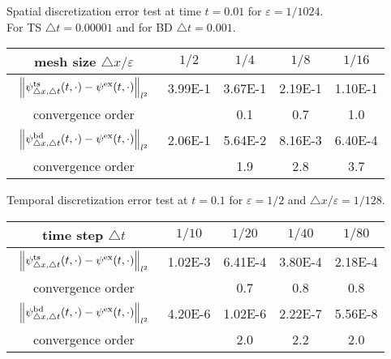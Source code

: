\documentclass[leqno,final]{siamltex}
\numberwithin{equation}{section}
\newcounter{me}
\begin{document}
\begin{table}[htbp]
\begin{center}
{Spatial discretization error test at time $t=0.01$ for ${{\varepsilon }}=1/1024$.\\
For TS ${\triangle} t=0.00001$ and for BD  ${\triangle} t=0.001$. }
\begin{tabular}{c|cccc}\hline
mesh size ${\triangle} x/{{\varepsilon }}$& $1/2$ & $1/4$ & $1/8$ &   $1/16$ \\ \hline
$\begin{array}{c}\vspace*{-4mm} \\
\left\|\psi^{\rm ts}_{{\triangle} x,{\triangle} t}(t,\cdot)-\psi^{\rm
ex}(t,\cdot)\right\|_{l^2}\\ \vspace*{-4mm} \end{array}$
 &  3.99E-1 & 3.67E-1 &  2.19E-1 & 1.10E-1 \\ \hline
convergence order & & 0.1 & 0.7& 1.0 \\ \hline \hline
$\begin{array}{c}\vspace*{-4mm} \\
\left\|\psi^{\rm bd}_{{\triangle} x,{\triangle} t}(t,\cdot)-\psi^{\rm
ex}(t,\cdot)\right\|_{l^2}\\ \vspace*{-4mm} \end{array}$
 &  2.06E-1& 5.64E-2 &  8.16E-3 &  6.40E-4 \\ \hline
convergence order & & 1.9& 2.8& 3.7  \\ \hline 
\end{tabular}\vspace{5mm}

{Temporal discretization error test at $t=0.1$ for ${{\varepsilon }}=1/2$ and
${\triangle} x/{{\varepsilon }}=1/128$.}
\begin{tabular}{c|cccc}\hline
time step ${\triangle} t$& $1/10$ & $1/20$ & $1/40$ &   $1/80$ \\ \hline
$\begin{array}{c}\vspace*{-4mm} \\
\left\|\psi^{\rm ts}_{{\triangle} x,{\triangle} t}(t,\cdot)-\psi^{\rm
ex}(t,\cdot)\right\|_{l^2}\\ \vspace*{-4mm} \end{array}$
 &  1.02E-3 & 6.41E-4 &  3.80E-4 & 2.18E-4 \\ \hline
convergence order & & 0.7 & 0.8& 0.8 \\ \hline \hline
$\begin{array}{c}\vspace*{-4mm} \\
\left\|\psi^{\rm bd}_{{\triangle} x,{\triangle} t}(t,\cdot)-\psi^{\rm
ex}(t,\cdot)\right\|_{l^2}\\ \vspace*{-4mm} \end{array}$
 &  4.20E-6 &1.02E-6 &  2.22E-7 & 5.56E-8 \\ \hline
convergence order & & 2.0 & 2.2& 2.0  \\ \hline 
\end{tabular}\vspace{5mm}


\end{center}
\end{table}
\end{document}
